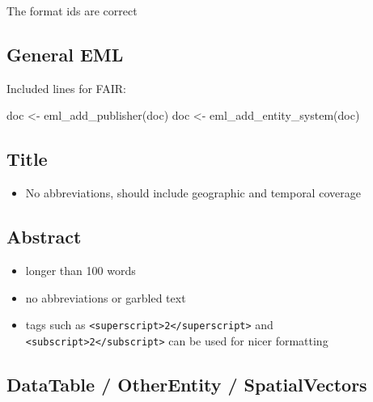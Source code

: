 \documentclass[
  letterpaper,
  DIV=11,
  numbers=noendperiod]{scrreprt}
\newenvironment{Shaded}{\begin{snugshade}}{\end{snugshade}}
\newcommand{\FunctionTok}[1]{\textcolor[rgb]{0.28,0.35,0.67}{#1}}
\newcommand{\NormalTok}[1]{\textcolor[rgb]{0.00,0.23,0.31}{#1}}
\newcommand{\OtherTok}[1]{\textcolor[rgb]{0.00,0.23,0.31}{#1}}
\providecommand{\tightlist}{%
  \setlength{\itemsep}{0pt}\setlength{\parskip}{0pt}}\usepackage{longtable,booktabs,array}
\begin{document}
The format ids are correct

\hypertarget{general-eml}{%
\subsection{General EML}\label{general-eml}}

Included lines for FAIR:

\begin{Shaded}
\begin{Highlighting}[]
\NormalTok{doc }\OtherTok{\textless{}{-}} \FunctionTok{eml\_add\_publisher}\NormalTok{(doc)}
\NormalTok{doc }\OtherTok{\textless{}{-}} \FunctionTok{eml\_add\_entity\_system}\NormalTok{(doc)}
\end{Highlighting}
\end{Shaded}

\hypertarget{title-1}{%
\subsection{Title}\label{title-1}}

\begin{itemize}
\tightlist
\item
  No abbreviations, should include geographic and temporal coverage
\end{itemize}

\hypertarget{abstract-1}{%
\subsection{Abstract}\label{abstract-1}}

\begin{itemize}
\tightlist
\item
  longer than 100 words
\item
  no abbreviations or garbled text
\item
  tags such as
  \texttt{\textless{}superscript\textgreater{}2\textless{}/superscript\textgreater{}}
  and
  \texttt{\textless{}subscript\textgreater{}2\textless{}/subscript\textgreater{}}
  can be used for nicer formatting
\end{itemize}

\hypertarget{datatable-otherentity-spatialvectors}{%
\subsection{DataTable / OtherEntity /
SpatialVectors}\label{datatable-otherentity-spatialvectors}}
\end{document}
